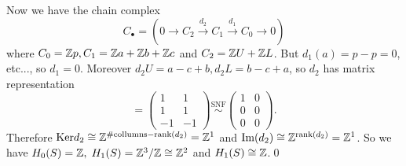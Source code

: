 Now we have the chain complex 
\begin{equation}
  C_\bullet = ( 0 \to C_2  \overset{d_2}{\to} C_1 \overset{d_1}{\to} C_0\to 0)
\end{equation}
where $C_0 = \mathbb{Z} p, C_1 = \mathbb{Z} a+\mathbb{Z} b+ \mathbb{Z} c$ and $C_2=\mathbb{Z} U+ \mathbb{Z} L$. But 
$d_1(a)= p - p=0$, etc..., so $d_1=0$. Moreover $d_2U = a - c + b, d_2 L = b - c + a$, so 
$d_2$ has matrix representation 
\begin{equation}
    [d_2]= \begin{pmatrix}
        1&1\\ 1&1 \\ -1&-1
    \end{pmatrix} \overset{\text{SNF}}{\sim}
    \begin{pmatrix}
        1&0\\0&0\\0&0
    \end{pmatrix}.
\end{equation}
Therefore $\text{Ker} d_2 \cong\mathbb{Z} ^{\#\text{collumns}- \text{rank}(d_2)}=\mathbb{Z}^1$ and 
$\text{Im}(d_2)\cong \mathbb{Z}^{\text{rank}(d_2)}=\mathbb{Z}^1$. So we have 
$H_0(S)=\mathbb{Z},\; H_1(S)=\mathbb{Z}^3/\mathbb{Z}\cong\mathbb{Z}^2$ and $H_1(S)\cong\mathbb{Z}$.\qed


